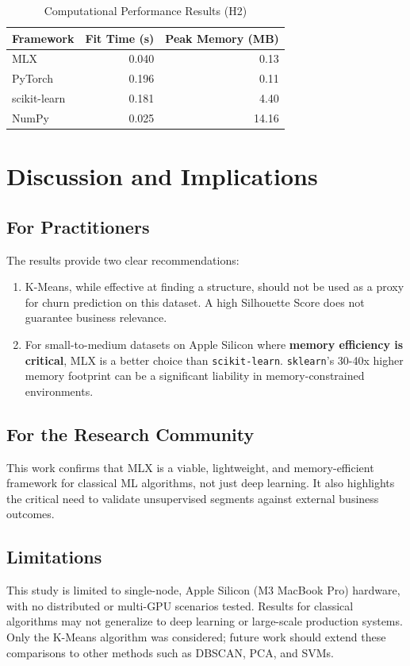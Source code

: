 \documentclass[twocolumn,a4paper]{article}
\begin{document}
\begin{table}[htbp]
\centering
\caption{Computational Performance Results (H2)}
\label{tab:h2-results}
\begin{tabular}{@{}l|r|r@{}}
\toprule
Framework & Fit Time (s) & Peak Memory (MB) \\
\midrule
MLX & 0.040 & 0.13 \\
PyTorch & 0.196 & 0.11 \\
scikit-learn & 0.181 & 4.40 \\
NumPy & 0.025 & 14.16 \\
\bottomrule
\end{tabular}
\end{table}

\section{Discussion and Implications}

\subsection{For Practitioners}
The results provide two clear recommendations:
\begin{enumerate}
    \item K-Means, while effective at finding a structure, should not be used as a proxy for churn prediction on this dataset. A high Silhouette Score does not guarantee business relevance.
    \item For small-to-medium datasets on Apple Silicon where \textbf{memory efficiency is critical}, MLX is a better choice than \texttt{scikit-learn}. \texttt{sklearn}'s 30-40x higher memory footprint can be a significant liability in memory-constrained environments.
\end{enumerate}

\subsection{For the Research Community}
This work confirms that MLX is a viable, lightweight, and memory-efficient framework for classical ML algorithms, not just deep learning. It also highlights the critical need to validate unsupervised segments against external business outcomes.

\subsection{Limitations}
This study is limited to single-node, Apple Silicon (M3 MacBook Pro) hardware, with no distributed or multi-GPU scenarios tested. Results for classical algorithms may not generalize to deep learning or large-scale production systems. Only the K-Means algorithm was considered; future work should extend these comparisons to other methods such as DBSCAN, PCA, and SVMs.
\end{document}
